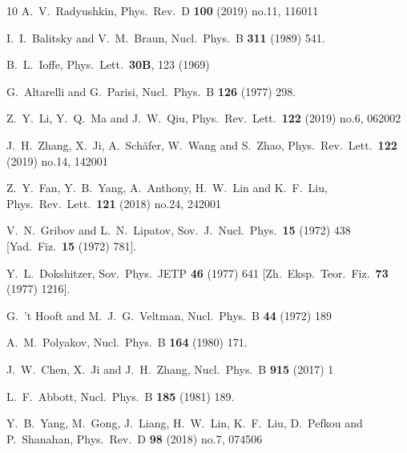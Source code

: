 \begin{thebibliography}{10}
  A.~V.~Radyushkin,
  Phys.\ Rev.\ D {\bf 100} (2019) no.11, 116011

  I.~I.~Balitsky and V.~M.~Braun,
  Nucl.\ Phys.\ B {\bf 311} (1989) 541.

  B.~L.~Ioffe,
  Phys.\ Lett.\ {\bf 30B}, 123 (1969)

  G.~Altarelli and G.~Parisi,
  Nucl.\ Phys.\ B {\bf 126} (1977) 298.

  Z.~Y.~Li, Y.~Q.~Ma and J.~W.~Qiu,
  Phys.\ Rev.\ Lett.\ {\bf 122} (2019) no.6, 062002

  J.~H.~Zhang, X.~Ji, A.~Sch{\"a}fer, W.~Wang and S.~Zhao,
  Phys.\ Rev.\ Lett.\ {\bf 122} (2019) no.14, 142001

  Z.~Y.~Fan, Y.~B.~Yang, A.~Anthony, H.~W.~Lin and K.~F.~Liu,
  Phys.\ Rev.\ Lett.\ {\bf 121} (2018) no.24, 242001

  V.~N.~Gribov and L.~N.~Lipatov,
  Sov.\ J.\ Nucl.\ Phys.\ {\bf 15} (1972) 438
  [Yad.\ Fiz.\ {\bf 15} (1972) 781].

  Y.~L.~Dokshitzer,
  Sov.\ Phys.\ JETP {\bf 46} (1977) 641
  [Zh.\ Eksp.\ Teor.\ Fiz.\ {\bf 73} (1977) 1216].

  G.~'t Hooft and M.~J.~G.~Veltman,
  Nucl.\ Phys.\ B {\bf 44} (1972) 189

  A.~M.~Polyakov,
  Nucl.\ Phys.\ B {\bf 164} (1980) 171.

  J.~W.~Chen, X.~Ji and J.~H.~Zhang,
  Nucl.\ Phys.\ B {\bf 915} (2017) 1

  L.~F.~Abbott,
  Nucl.\ Phys.\ B {\bf 185} (1981) 189.

  Y.~B.~Yang, M.~Gong, J.~Liang, H.~W.~Lin, K.~F.~Liu, D.~Pefkou and P.~Shanahan,
  Phys.\ Rev.\ D {\bf 98} (2018) no.7, 074506

\end{thebibliography}

